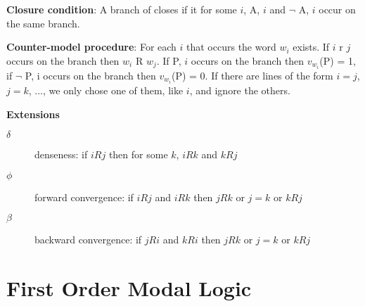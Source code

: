 \documentclass[a4paper]{article}
\begin{document}
\vspace{3em}
\textbf{Closure condition}: A branch of closes if it for some $i$, A, $i$ and $\lnot$ A, $i$ occur on the same branch.

\textbf{Counter-model procedure}: For each $i$ that occurs the word $w_i$ exists. If $i$ r $j$ occurs on the branch then $w_i$ R $w_j$. If P, $i$ occurs on the branch then $v_{w_i}$(P) = 1, if $\lnot$ P, i occurs on the branch then $v_{w_i}$(P) = 0. If there are lines of the form $i = j$, $j = k$, $...$, we only chose one of them, like $i$, and ignore the others.

\textbf{Extensions}
\begin{description}
	\item[$\delta$] denseness: if $iRj$ then for some $k$, $iRk$ and $kRj$ 
	\item[$\phi$] forward convergence: if $iRj$ and $iRk$ then $jRk$ or $j = k$ or $kRj$
	\item[$\beta$] backward convergence: if $jRi$ and $kRi$ then $jRk$ or $j = k$ or $kRj$
\end{description}

\pagebreak

\section{First Order Modal Logic}
\end{document}

